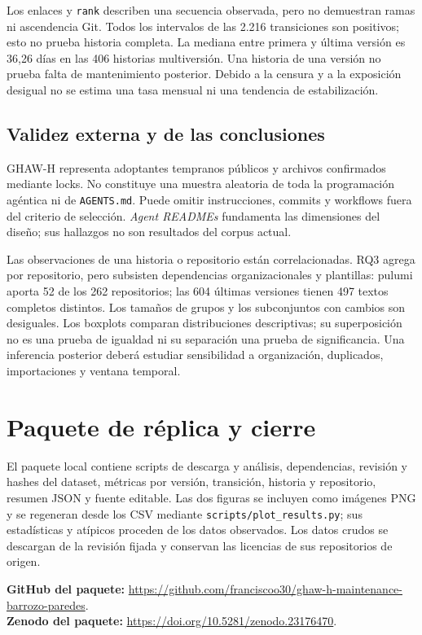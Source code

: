 \documentclass[conference,a4paper]{IEEEtran}
\newcommand{\GitHubReplica}{\url{https://github.com/franciscoo30/ghaw-h-maintenance-barrozo-paredes}}
\newcommand{\ZenodoReplica}{\url{https://doi.org/10.5281/zenodo.23176470}}
\begin{document}
Los enlaces y \texttt{rank} describen una secuencia observada, pero no demuestran ramas ni ascendencia Git. Todos los intervalos de las 2.216 transiciones son positivos; esto no prueba historia completa. La mediana entre primera y última versión es 36,26 días en las 406 historias multiversión. Una historia de una versión no prueba falta de mantenimiento posterior. Debido a la censura y a la exposición desigual no se estima una tasa mensual ni una tendencia de estabilización.

\subsection{Validez externa y de las conclusiones}
GHAW-H representa adoptantes tempranos públicos y archivos confirmados mediante locks. No constituye una muestra aleatoria de toda la programación agéntica ni de \texttt{AGENTS.md}. Puede omitir instrucciones, commits y workflows fuera del criterio de selección. \textit{Agent READMEs} fundamenta las dimensiones del diseño; sus hallazgos no son resultados del corpus actual.

Las observaciones de una historia o repositorio están correlacionadas. RQ3 agrega por repositorio, pero subsisten dependencias organizacionales y plantillas: pulumi aporta 52 de los 262 repositorios; las 604 últimas versiones tienen 497 textos completos distintos. Los tamaños de grupos y los subconjuntos con cambios son desiguales. Los boxplots comparan distribuciones descriptivas; su superposición no es una prueba de igualdad ni su separación una prueba de significancia. Una inferencia posterior deberá estudiar sensibilidad a organización, duplicados, importaciones y ventana temporal.

\section{Paquete de réplica y cierre}
El paquete local contiene scripts de descarga y análisis, dependencias, revisión y hashes del dataset, métricas por versión, transición, historia y repositorio, resumen JSON y fuente editable. Las dos figuras se incluyen como imágenes PNG y se regeneran desde los CSV mediante \texttt{scripts/plot\_results.py}; sus estadísticas y atípicos proceden de los datos observados. Los datos crudos se descargan de la revisión fijada y conservan las licencias de sus repositorios de origen.

\noindent\textbf{GitHub del paquete:} \GitHubReplica.\\
\textbf{Zenodo del paquete:} \ZenodoReplica.
\end{document}

